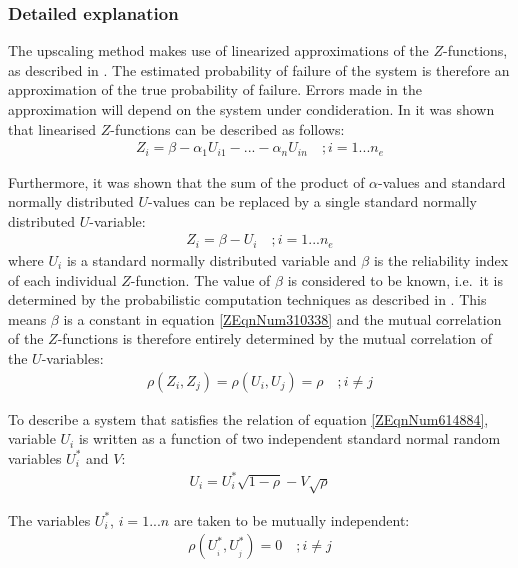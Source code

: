 {\subsubsection{Detailed explanation}\label{Section_2.4.3.2}

The upscaling method makes use of linearized approximations of the $Z$-functions, as described in .
The estimated probability of failure of the system is therefore an approximation of the true probability of failure.
Errors made in the approximation will depend on the system under condideration.
In  it was shown that linearised $Z$-functions can be described as follows:
\begin{align}
Z_{i} =\beta -\alpha _{1} U_{i1} -...-\alpha _{n} U_{in} \quad ;i=1...n_{e} \label{ZEqnNum573383} 
\end{align}

Furthermore, it was shown that the sum of the product of $\alpha$-values and standard normally distributed $U$-values can be replaced by a single standard normally distributed $U$-variable:
\begin{align}
Z_{i} =\beta -U_{i} \quad ;i=1...n_{e} \label{ZEqnNum310338} 
\end{align}
where $U_i$ is a standard normally distributed variable and $\beta$ is the reliability index of each individual $Z$-function.
The value of $\beta$ is considered to be known, i.e.\ it is determined by the probabilistic computation techniques as described in .
This means $\beta$ is a constant in equation \eqref{ZEqnNum310338} and the mutual correlation of the $Z$-functions is therefore entirely determined by the mutual correlation of the $U$-variables:
\begin{align}
\rho \left(Z_{i} ,Z_{j} \right)=\rho \left(U_{i} ,U_{j} \right)=\rho \quad ;i\ne j\label{ZEqnNum614884} 
\end{align}

To describe a system that satisfies the relation of equation \eqref{ZEqnNum614884}, variable $U_i$ is written as a function of two independent standard normal random variables $U_i^{*}$ and $V$:
\begin{align}
U_{i} =U_{i}^{*} \sqrt{1-\rho } -V\sqrt{\rho } \label{ZEqnNum725764} 
\end{align}

The variables $U_i^{*}$, $i=1...n$ are taken to be mutually independent:
\begin{align}
\rho \left(U_{_{i} }^{*} ,U_{_{j} }^{*} \right)=0\quad ;i\ne j\label{ZEqnNum257919} 
\end{align}

}

